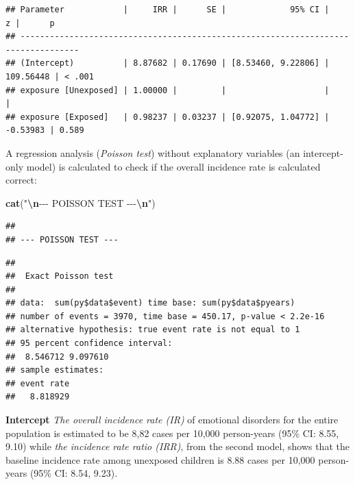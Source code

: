 \documentclass[
]{article}
\newenvironment{Shaded}{\begin{snugshade}}{\end{snugshade}}
\newcommand{\AttributeTok}[1]{\textcolor[rgb]{0.13,0.29,0.53}{#1}}
\newcommand{\FunctionTok}[1]{\textcolor[rgb]{0.13,0.29,0.53}{\textbf{#1}}}
\newcommand{\NormalTok}[1]{#1}
\newcommand{\SpecialCharTok}[1]{\textcolor[rgb]{0.81,0.36,0.00}{\textbf{#1}}}
\newcommand{\StringTok}[1]{\textcolor[rgb]{0.31,0.60,0.02}{#1}}
\begin{document}
\begin{verbatim}
## Parameter            |     IRR |      SE |             95% CI |         z |      p
## ----------------------------------------------------------------------------------
## (Intercept)          | 8.87682 | 0.17690 | [8.53460, 9.22806] | 109.56448 | < .001
## exposure [Unexposed] | 1.00000 |         |                    |           |       
## exposure [Exposed]   | 0.98237 | 0.03237 | [0.92075, 1.04772] |  -0.53983 | 0.589
\end{verbatim}

A regression analysis (\emph{Poisson test}) without explanatory
variables (an intercept-only model) is calculated to check if the
overall incidence rate is calculated correct:

\begin{Shaded}
\begin{Highlighting}[]
\FunctionTok{cat}\NormalTok{(}\StringTok{"}\SpecialCharTok{\textbackslash{}n}\StringTok{{-}{-}{-} POISSON TEST {-}{-}{-}}\SpecialCharTok{\textbackslash{}n}\StringTok{"}\NormalTok{)}
\end{Highlighting}
\end{Shaded}

\begin{verbatim}
## 
## --- POISSON TEST ---
\end{verbatim}

\begin{Shaded}
\end{Shaded}

\begin{verbatim}
## 
##  Exact Poisson test
## 
## data:  sum(py$data$event) time base: sum(py$data$pyears)
## number of events = 3970, time base = 450.17, p-value < 2.2e-16
## alternative hypothesis: true event rate is not equal to 1
## 95 percent confidence interval:
##  8.546712 9.097610
## sample estimates:
## event rate 
##   8.818929
\end{verbatim}

\textbf{Intercept} \emph{The overall incidence rate (IR)} of emotional
disorders for the entire population is estimated to be 8,82 cases per
10,000 person-years (95\% CI: 8.55, 9.10) while \emph{the incidence rate
ratio (IRR)}, from the second model, shows that the baseline incidence
rate among unexposed children is 8.88 cases per 10,000 person-years
(95\% CI: 8.54, 9.23).
\end{document}
